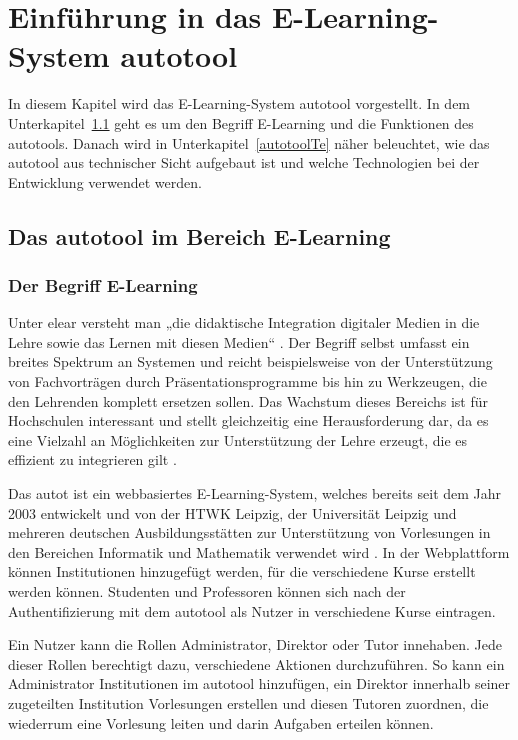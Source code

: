 \chapter{Einführung in das E-Learning-System autotool}\label{ch3}
In diesem Kapitel wird das E-Learning-System autotool vorgestellt. In dem Unterkapitel~\ref{autotoolEl} geht es um den Begriff E-Learning und die Funktionen des autotools. Danach wird in Unterkapitel~\ref{autotoolTe} näher beleuchtet, wie das autotool aus technischer Sicht aufgebaut ist und welche Technologien bei der Entwicklung verwendet werden.

\section{Das autotool im Bereich E-Learning}\label{autotoolEl}
\subsection{Der Begriff E-Learning}
Unter \Gls{elear} versteht man „die didaktische Integration digitaler Medien in die Lehre sowie das Lernen mit diesen Medien“ \cite[S.~13]{ELbrosch}. Der Begriff selbst umfasst ein breites Spektrum an Systemen und reicht beispielsweise von der Unterstützung von Fachvorträgen durch Präsentationsprogramme bis hin zu Werkzeugen, die den Lehrenden komplett ersetzen sollen. Das Wachstum dieses Bereichs ist für Hochschulen interessant und stellt gleichzeitig eine Herausforderung dar, da es eine Vielzahl an Möglichkeiten zur Unterstützung der Lehre erzeugt, die es effizient zu integrieren gilt \cite[S.~13]{ELbrosch}. 

Das \gls{autot} ist ein webbasiertes E-Learning-System, welches bereits seit dem Jahr 2003 entwickelt und von der HTWK Leipzig, der Universität Leipzig und mehreren deutschen Ausbildungsstätten zur Unterstützung von Vorlesungen in den Bereichen Informatik und Mathematik verwendet wird \cite[S.~1]{atnetzw}. In der Webplattform können Institutionen hinzugefügt werden, für die verschiedene Kurse erstellt werden können. Studenten und Professoren können sich nach der Authentifizierung mit dem autotool als Nutzer in verschiedene Kurse eintragen. 

Ein Nutzer kann die Rollen Administrator, Direktor oder Tutor innehaben. Jede dieser Rollen berechtigt dazu, verschiedene Aktionen durchzuführen. So kann ein Administrator Institutionen im autotool hinzufügen, ein Direktor innerhalb seiner zugeteilten Institution Vorlesungen erstellen und diesen Tutoren zuordnen, die wiederrum eine Vorlesung leiten und darin Aufgaben erteilen können. 

